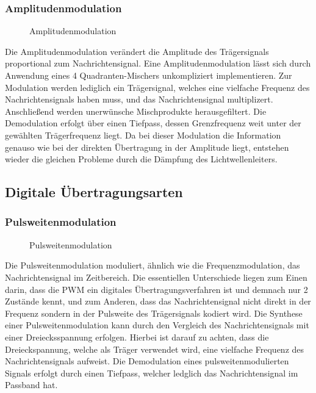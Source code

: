 \subsubsection{Amplitudenmodulation}
\begin{figure}[H]
\centering
  
  \caption{Amplitudenmodulation}
  \label{fig:am}
\end{figure}
Die Amplitudenmodulation verändert die Amplitude des Trägersignals proportional zum Nachrichtensignal.
Eine Amplitudenmodulation lässt sich durch Anwendung eines 4 Quadranten-Mischers unkompliziert implementieren. Zur Modulation werden lediglich ein Trägersignal, welches eine vielfache Frequenz des Nachrichtensignals haben muss, und das Nachrichtensignal multiplizert. Anschließend werden unerwünsche Mischprodukte herausgefiltert. Die Demodulation erfolgt über einen Tiefpass, dessen Grenzfrequenz weit unter der gewählten Trägerfrequenz liegt.
Da bei dieser Modulation die Information genauso wie bei der direkten Übertragung in der Amplitude liegt, entstehen wieder die gleichen Probleme durch die Dämpfung des Lichtwellenleiters.

\subsection{Digitale Übertragungsarten}
\subsubsection{Pulsweitenmodulation}
\begin{figure}[H]
\centering
  
  \caption{Pulsweitenmodulation}
  \label{fig:pwm}
\end{figure}
Die Pulsweitenmodulation moduliert, ähnlich wie die Frequenzmodulation, das Nachrichtensignal im Zeitbereich. 
Die essentiellen Unterschiede liegen zum Einen darin, dass die PWM ein digitales Übertragungsverfahren ist und demnach nur 2 Zustände kennt, und zum Anderen, dass das Nachrichtensignal nicht direkt in der Frequenz sondern in der Pulsweite des Trägersignals kodiert wird. Die Synthese einer Pulsweitenmodulation kann durch den Vergleich des Nachrichtensignals mit einer Dreiecksspannung erfolgen. Hierbei ist darauf zu achten, dass die Dreieckspannung, welche als Träger verwendet wird, eine vielfache Frequenz des Nachrichtensignals aufweist. Die Demodulation eines pulsweitenmodulierten Signals erfolgt durch einen Tiefpass, welcher ledglich das Nachrichtensignal im Passband hat. 




